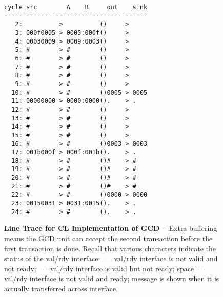 
\begin{figure}

  \begin{minipage}[t]{0.5\tw}
  \footnotesize
  \begin{Verbatim}[xleftmargin=0.3in]
cycle src        A    B     out    sink
---------------------------------------
   2:          >          ()     >
   3: 000f0005 > 0005:000f()     >
   4: 00030009 > 0009:0003()     >
   5: #        > #        ()     >
   6: #        > #        ()     >
   7: #        > #        ()     >
   8: #        > #        ()     >
   9: #        > #        ()     >
  10: #        > #        ()0005 > 0005
  11: 00000000 > 0000:0000().    > .
  12: #        > #        ()     >
  13: #        > #        ()     >
  14: #        > #        ()     >
  15: #        > #        ()     >
  16: #        > #        ()0003 > 0003
  17: 001b000f > 000f:001b().    > .
  18: #        > #        ()#    > #
  19: #        > #        ()#    > #
  20: #        > #        ()#    > #
  21: #        > #        ()#    > #
  22: #        > #        ()0000 > 0000
  23: 00150031 > 0031:0015().    > .
  24: #        > #        ().    > .
  \end{Verbatim}
  \end{minipage}%
  \hfill%
  \begin{minipage}[t]{0.47\tw}
  \caption{\textbf{Line Trace for CL Implementation of GCD --} Extra
    buffering means the GCD unit can accept the second transaction before
    the first transaction is done. Recall that various characters
    indicate the status of the val/rdy interface: ~= val/rdy
    interface is not valid and not ready; \TT{\#}~= val/rdy interface is
    valid but not ready; space~= val/rdy interface is not valid and
    ready; message is shown when it is actually transferred across
    interface.}
  \label{fig-tut3-gcd-cl-linetrace}
  \end{minipage}
  \hspace*{0.1in}\mbox{}

\end{figure}

